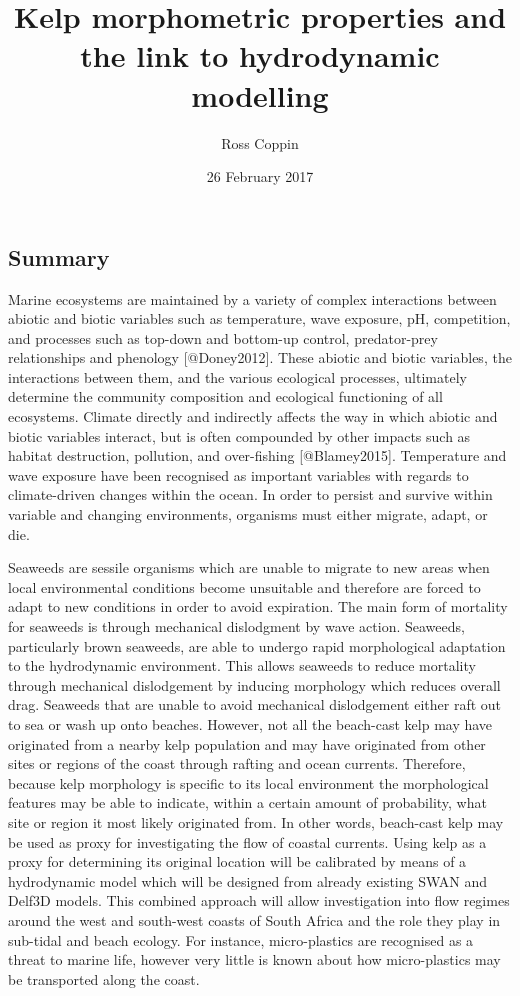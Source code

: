 \documentclass[]{article}
\title{Kelp morphometric properties and the link to hydrodynamic modelling}
\author{Ross Coppin}
\date{26 February 2017}
\begin{document}
\maketitle

{
\setcounter{tocdepth}{2}
\tableofcontents
}
\subsection{Summary}\label{summary}

Marine ecosystems are maintained by a variety of complex interactions
between abiotic and biotic variables such as temperature, wave exposure,
pH, competition, and processes such as top-down and bottom-up control,
predator-prey relationships and phenology {[}@Doney2012{]}. These
abiotic and biotic variables, the interactions between them, and the
various ecological processes, ultimately determine the community
composition and ecological functioning of all ecosystems. Climate
directly and indirectly affects the way in which abiotic and biotic
variables interact, but is often compounded by other impacts such as
habitat destruction, pollution, and over-fishing {[}@Blamey2015{]}.
Temperature and wave exposure have been recognised as important
variables with regards to climate-driven changes within the ocean. In
order to persist and survive within variable and changing environments,
organisms must either migrate, adapt, or die.

Seaweeds are sessile organisms which are unable to migrate to new areas
when local environmental conditions become unsuitable and therefore are
forced to adapt to new conditions in order to avoid expiration. The main
form of mortality for seaweeds is through mechanical dislodgment by wave
action. Seaweeds, particularly brown seaweeds, are able to undergo rapid
morphological adaptation to the hydrodynamic environment. This allows
seaweeds to reduce mortality through mechanical dislodgement by inducing
morphology which reduces overall drag. Seaweeds that are unable to avoid
mechanical dislodgement either raft out to sea or wash up onto beaches.
However, not all the beach-cast kelp may have originated from a nearby
kelp population and may have originated from other sites or regions of
the coast through rafting and ocean currents. Therefore, because kelp
morphology is specific to its local environment the morphological
features may be able to indicate, within a certain amount of
probability, what site or region it most likely originated from. In
other words, beach-cast kelp may be used as proxy for investigating the
flow of coastal currents. Using kelp as a proxy for determining its
original location will be calibrated by means of a hydrodynamic model
which will be designed from already existing SWAN and Delf3D models.
This combined approach will allow investigation into flow regimes around
the west and south-west coasts of South Africa and the role they play in
sub-tidal and beach ecology. For instance, micro-plastics are recognised
as a threat to marine life, however very little is known about how
micro-plastics may be transported along the coast.
\end{document}
